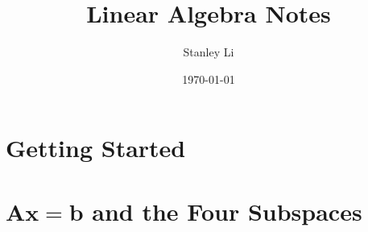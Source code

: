 \documentclass[11pt, letterpaper]{article}
\title{Linear Algebra Notes}
\author{Stanley Li}
\date{\today}
\theoremstyle{definition}
\theoremstyle{definition}
\theoremstyle{definition}
\theoremstyle{remark}
\newcommand{\vect}[1]{\ensuremath{\mathbf{#1}}}
\begin{document}
\maketitle

\tableofcontents

\section{Getting Started}



\section{\texorpdfstring{$\vect{A}\vect{x}=\vect{b}$}{Axb} and the Four Subspaces}


\end{document}
